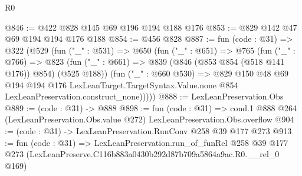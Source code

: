\begin{lexlean}{R0}
\begin{coremodule}
@846 := @422 @828 @145 @69 @196 @194 @188 @176
@853 := @829 @142 @47 @69 @194 @194 @176 @188
@854 := @456 @828
@887 := fun (code : @31) =>
  @322
    (@529
      (fun ("_" : @531) =>
      @650
        (fun ("_" : @651) =>
        @765
          (fun ("_" : @766) =>
          @823
            (fun ("_" : @661) => @839 (@846 (@853 @854 (@518 @141 @176)) @854) (@525 @188))
            (fun ("_" : @660 @530) =>
            @829
              @150
              @48
              @69
              @194
              @194
              @176
              LexLeanTarget.TargetSyntax.Value.none
              @854
              LexLeanPreservation.construct_none)))))
@888 := LexLeanPreservation.Obs
@889 := (code : @31) -> @888
@898 := fun (code : @31) =>
  cond.{1} @888 @264 (LexLeanPreservation.Obs.value @272) LexLeanPreservation.Obs.overflow
@904 := (code : @31) -> LexLeanPreservation.RunConv @258 @39 @177 @273
@913 := fun (code : @31) =>
  LexLeanPreservation.run_of_funRel
    @258
    @39
    @177
    @273
    (LexLeanPreserve.C116b883a0430b292d87b709a5864a9ac.R0.__rel_0 @169)
\end{coremodule}
\end{lexlean}
